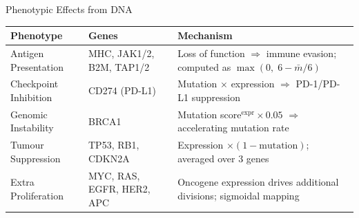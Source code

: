 \documentclass[aspectratio=169,10pt]{beamer}
\begin{document}
\begin{frame}{Phenotypic Effects from DNA}
  \centering
  \small
  \begin{tabular}{@{}l l p{5.5cm}@{}}
    \toprule
    \textbf{Phenotype} & \textbf{Genes} & \textbf{Mechanism} \\
    \midrule
    Antigen Presentation &
      MHC, JAK1/2, B2M, TAP1/2 &
      Loss of function $\Rightarrow$ immune evasion; computed as $\max(0,\; 6 - \bar{m}/6)$ \\[0.3em]
    Checkpoint Inhibition &
      CD274 (PD-L1) &
      Mutation $\times$ expression $\Rightarrow$ PD-1/PD-L1 suppression \\[0.3em]
    Genomic Instability &
      BRCA1 &
      Mutation score$^\text{expr} \times 0.05$ $\Rightarrow$ accelerating mutation rate \\[0.3em]
    Tumour Suppression &
      TP53, RB1, CDKN2A &
      Expression $\times (1 - \text{mutation})$; averaged over 3 genes \\[0.3em]
    Extra Proliferation &
      MYC, RAS, EGFR, HER2, APC &
      Oncogene expression drives additional divisions; sigmoidal mapping \\
    \bottomrule
  \end{tabular}
\end{frame}
\end{document}

